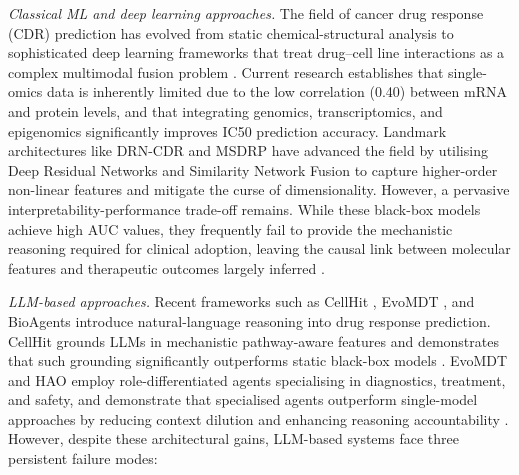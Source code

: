 \documentclass[11pt,letterpaper]{article}
\begin{document}
\textit{Classical ML and deep learning approaches.} The field of cancer drug response (CDR)
prediction has evolved from static chemical-structural analysis to sophisticated deep learning
frameworks that treat drug--cell line interactions as a complex multimodal fusion problem
\cite{ref9,ref10}. Current research establishes that single-omics data is inherently limited due
to the low correlation (0.40) between mRNA and protein levels, and that integrating genomics,
transcriptomics, and epigenomics significantly improves IC50 prediction accuracy. Landmark
architectures like DRN-CDR \cite{ref9} and MSDRP \cite{ref10} have advanced the field by
utilising Deep Residual Networks and Similarity Network Fusion to capture higher-order
non-linear features and mitigate the curse of dimensionality. However, a pervasive
interpretability-performance trade-off remains. While these black-box models achieve high AUC
values, they frequently fail to provide the mechanistic reasoning required for clinical adoption,
leaving the causal link between molecular features and therapeutic outcomes largely inferred
\cite{ref7,ref8}.

\textit{LLM-based approaches.} Recent frameworks such as CellHit \cite{ref26}, EvoMDT
\cite{ref11}, and BioAgents \cite{ref17} introduce natural-language reasoning into drug response
prediction. CellHit grounds LLMs in mechanistic pathway-aware features and demonstrates that
such grounding significantly outperforms static black-box models \cite{ref25}. EvoMDT and
HAO employ role-differentiated agents specialising in diagnostics, treatment, and safety, and
demonstrate that specialised agents outperform single-model approaches by reducing context
dilution and enhancing reasoning accountability \cite{ref11,ref12}. However, despite these
architectural gains, LLM-based systems face three persistent failure modes:
\end{document}
